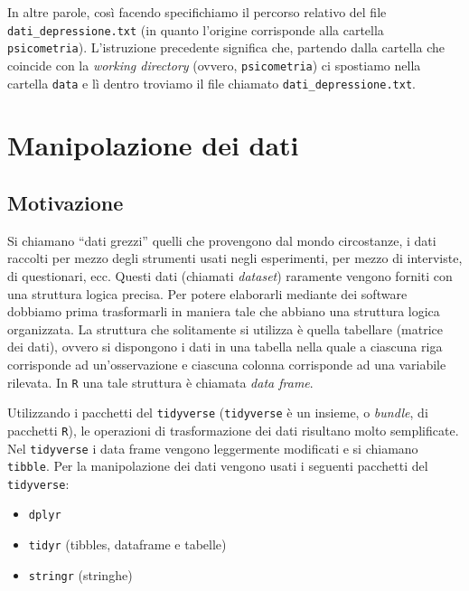 \documentclass[
  11pt,
]{krantz}
\providecommand{\tightlist}{%
  \setlength{\itemsep}{0pt}\setlength{\parskip}{0pt}}
\theoremstyle{definition}
\theoremstyle{definition}
\theoremstyle{definition}
\theoremstyle{definition}
\theoremstyle{remark}
\begin{document}
In altre parole, così facendo specifichiamo il percorso relativo del file \texttt{dati\_depressione.txt} (in quanto l'origine corrisponde alla cartella \texttt{psicometria}). L'istruzione precedente significa che, partendo dalla cartella che coincide con la \emph{working directory} (ovvero, \texttt{psicometria}) ci spostiamo nella cartella \texttt{data} e lì dentro troviamo il file chiamato \texttt{dati\_depressione.txt}.

\hypertarget{manipolazione-dei-dati}{%
\section{Manipolazione dei dati}\label{manipolazione-dei-dati}}

\hypertarget{motivazione}{%
\subsection{Motivazione}\label{motivazione}}

Si chiamano ``dati grezzi'' quelli che provengono dal mondo circostanze, i dati raccolti per mezzo degli strumenti usati negli esperimenti, per mezzo di interviste, di questionari, ecc. Questi dati (chiamati \emph{dataset}) raramente vengono forniti con una struttura logica precisa. Per potere elaborarli mediante dei software dobbiamo prima trasformarli in maniera tale che abbiano una struttura logica organizzata. La struttura che solitamente si utilizza è quella tabellare (matrice dei dati), ovvero si dispongono i dati in una tabella nella quale a ciascuna riga corrisponde ad un'osservazione e ciascuna colonna corrisponde ad una variabile rilevata. In \texttt{R} una tale struttura è chiamata \emph{data frame}.

Utilizzando i pacchetti del \texttt{tidyverse} (\texttt{tidyverse} è un insieme, o \emph{bundle}, di pacchetti \texttt{R}), le operazioni di trasformazione dei dati risultano molto semplificate. Nel \texttt{tidyverse} i data frame vengono leggermente modificati e si chiamano \texttt{tibble}. Per la manipolazione dei dati vengono usati i seguenti pacchetti del \texttt{tidyverse}:

\begin{itemize}
\tightlist
\item
  \texttt{dplyr}
\item
  \texttt{tidyr} (tibbles, dataframe e tabelle)
\item
  \texttt{stringr} (stringhe)
\end{itemize}
\end{document}

